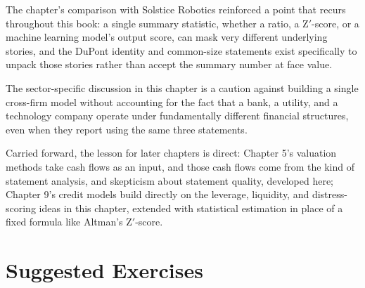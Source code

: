 \documentclass[../ai_in_finance]{subfiles}
\begin{document}
The chapter's comparison with Solstice Robotics reinforced a point that recurs throughout this book: a single summary statistic, whether a ratio, a Z$'$-score, or a machine learning model's output score, can mask very different underlying stories, and the DuPont identity and common-size statements exist specifically to unpack those stories rather than accept the summary number at face value.

The sector-specific discussion in this chapter is a caution against building a single cross-firm model without accounting for the fact that a bank, a utility, and a technology company operate under fundamentally different financial structures, even when they report using the same three statements.

Carried forward, the lesson for later chapters is direct: Chapter 5's valuation methods take cash flows as an input, and those cash flows come from the kind of statement analysis, and skepticism about statement quality, developed here; Chapter 9's credit models build directly on the leverage, liquidity, and distress-scoring ideas in this chapter, extended with statistical estimation in place of a fixed formula like Altman's Z$'$-score.

\section{Suggested Exercises}
\end{document}
